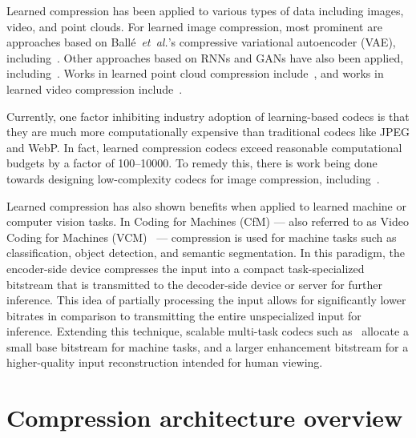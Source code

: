 Learned compression has been applied to various types of data including images, video, and point clouds.
For learned image compression, most prominent are approaches based on Ballé~\emph{et~al.}'s compressive variational autoencoder (VAE), including~\cite{minnen2018joint,cheng2020learned,he2022elic}.
Other approaches based on RNNs and GANs have also been applied, including~\cite{toderici2017rnn,mentzer2020highfidelity}.
Works in learned point cloud compression include~\cite{yan2019deep,he2022density,pang2022graspnet,fu2022octattention,you2022ipdae}, and works in learned video compression include~\cite{rippel2019learned,agustsson2020scalespaceflow,hu2021fvc,ho2022canf}.

Currently, one factor inhibiting industry adoption of learning-based codecs is that they are much more computationally expensive than traditional codecs like JPEG and WebP.
In fact, learned compression codecs exceed reasonable computational budgets by a factor of 100--10000\texttimes{}.
To remedy this, there is work being done towards designing low-complexity codecs for image compression, including~\cite{galpin2023entropy,ladune2023coolchic,leguay2023lowcomplexity,kamisli2023lowcomplexity}.

Learned compression has also shown benefits when applied to learned machine or computer vision tasks.
In Coding for Machines (CfM) --- also referred to as Video Coding for Machines (VCM)~\cite{duan2020vcm} --- compression is used for machine tasks such as classification, object detection, and semantic segmentation.
In this paradigm, the encoder-side device compresses the input into a compact task-specialized bitstream that is transmitted to the decoder-side device or server for further inference.
This idea of partially processing the input allows for significantly lower bitrates in comparison to transmitting the entire unspecialized input for inference.
Extending this technique, scalable multi-task codecs such as~\cite{choi2021latentspace,choi2022sichm} allocate a small base bitstream for machine tasks, and a larger enhancement bitstream for a higher-quality input reconstruction intended for human viewing.




\section{Compression architecture overview}

